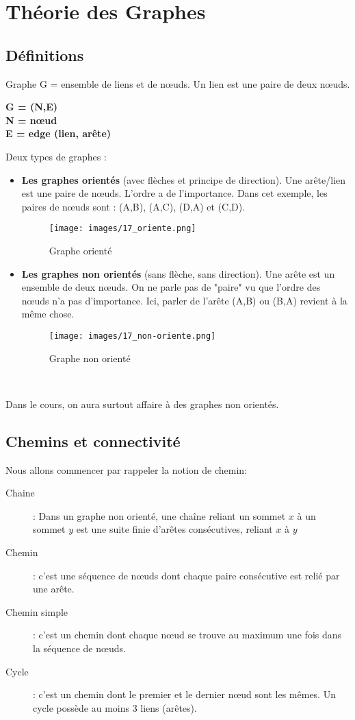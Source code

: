 \chapter{Théorie des Graphes}

\section{Définitions\\}
Graphe G = ensemble de liens et de nœuds. Un lien est une paire de deux nœuds.
\begin{center}
\textbf{
G = (N,E)\\
N = nœud\\
E = edge (lien, arête)\\
}
\end{center}
Deux types de graphes :
\begin{itemize}

\item \textbf{Les graphes orientés} (avec flèches et principe de direction). Une arête/lien est une paire de nœuds. L'ordre a de l'importance. Dans cet exemple, les paires de nœuds sont : (A,B), (A,C), (D,A) et (C,D). 
\begin{figure}[!h]
\centering
\texttt{[image: images/17\_oriente.png]}
\caption{Graphe orienté}
\end{figure}
\item \textbf{Les graphes non orientés} (sans flèche, sans direction). Une arête est un ensemble de deux nœuds. On ne parle pas de "paire" vu que l'ordre des nœuds n'a pas d'importance. Ici, parler de l'arête (A,B) ou (B,A) revient à la même chose.
\begin{figure}[!h]
\centering
\texttt{[image: images/17\_non-oriente.png]}
\caption{Graphe non orienté}
\end{figure}
\\
\end{itemize}
Dans le cours, on aura surtout affaire à des graphes non orientés.

\section{Chemins et connectivité}
Nous allons commencer par rappeler la notion de chemin:
	\begin{description}
	\item [Chaine] : Dans un graphe non orienté, une chaîne reliant un sommet $x$ à un sommet $y$ est une suite finie d'arêtes consécutives, reliant $x$ à $y$
	\item[Chemin]: c'est une séquence de n\oe uds dont chaque paire consécutive est relié par une arête.
    	\item[Chemin simple]: c'est un chemin dont chaque n\oe ud se trouve au maximum une fois dans la séquence de n\oe uds.
    	\item[Cycle]: c'est un chemin dont le premier et le dernier n\oe ud sont les mêmes. Un cycle possède au moins 3 liens (arêtes).\\
	\end{description}


